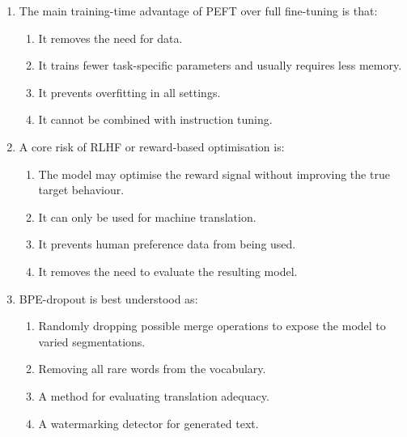 \documentclass[11pt,a4paper]{article}
\begin{document}
\begin{enumerate}[leftmargin=*]
\begin{enumerate}
\item The main training-time advantage of PEFT over full fine-tuning is that:
\begin{enumerate}[label=\Alph*.]
\item It removes the need for data.
\item It trains fewer task-specific parameters and usually requires less memory.
\item It prevents overfitting in all settings.
\item It cannot be combined with instruction tuning.
\end{enumerate}

\item A core risk of RLHF or reward-based optimisation is:
\begin{enumerate}[label=\Alph*.]
\item The model may optimise the reward signal without improving the true target behaviour.
\item It can only be used for machine translation.
\item It prevents human preference data from being used.
\item It removes the need to evaluate the resulting model.
\end{enumerate}

\item BPE-dropout is best understood as:
\begin{enumerate}[label=\Alph*.]
\item Randomly dropping possible merge operations to expose the model to varied segmentations.
\item Removing all rare words from the vocabulary.
\item A method for evaluating translation adequacy.
\item A watermarking detector for generated text.
\end{enumerate}
\end{enumerate}

\end{enumerate}
\end{document}
